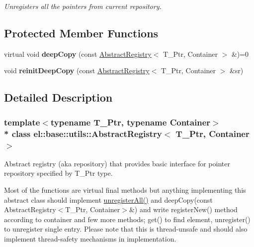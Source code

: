 \begin{DoxyCompactItemize}
\begin{DoxyCompactList}\small\item\em Unregisters all the pointers from current repository. \end{DoxyCompactList}\end{DoxyCompactItemize}
\subsection*{Protected Member Functions}
\begin{DoxyCompactItemize}
\item 
virtual void {\bfseries deep\+Copy} (const \hyperlink{classel_1_1base_1_1utils_1_1AbstractRegistry}{Abstract\+Registry}$<$ T\+\_\+\+Ptr, Container $>$ \&)=0\hypertarget{classel_1_1base_1_1utils_1_1AbstractRegistry_aaf42dab7089a9b1198e2920983ca82bb}{}\label{classel_1_1base_1_1utils_1_1AbstractRegistry_aaf42dab7089a9b1198e2920983ca82bb}

\item 
void {\bfseries reinit\+Deep\+Copy} (const \hyperlink{classel_1_1base_1_1utils_1_1AbstractRegistry}{Abstract\+Registry}$<$ T\+\_\+\+Ptr, Container $>$ \&sr)\hypertarget{classel_1_1base_1_1utils_1_1AbstractRegistry_a529677fb42e78d03c36cdea49f8877c9}{}\label{classel_1_1base_1_1utils_1_1AbstractRegistry_a529677fb42e78d03c36cdea49f8877c9}

\end{DoxyCompactItemize}


\subsection{Detailed Description}
\subsubsection*{template$<$typename T\+\_\+\+Ptr, typename Container$>$\\*
class el\+::base\+::utils\+::\+Abstract\+Registry$<$ T\+\_\+\+Ptr, Container $>$}

Abstract registry (aka repository) that provides basic interface for pointer repository specified by T\+\_\+\+Ptr type. 

Most of the functions are virtual final methods but anything implementing this abstract class should implement \hyperlink{classel_1_1base_1_1utils_1_1AbstractRegistry_a19223bc1fea48dbe6b47b4879aa4672f}{unregister\+All()} and deep\+Copy(const Abstract\+Registry$<$\+T\+\_\+\+Ptr, Container$>$\&) and write register\+New() method according to container and few more methods; get() to find element, unregister() to unregister single entry. Please note that this is thread-\/unsafe and should also implement thread-\/safety mechanisms in implementation. 

